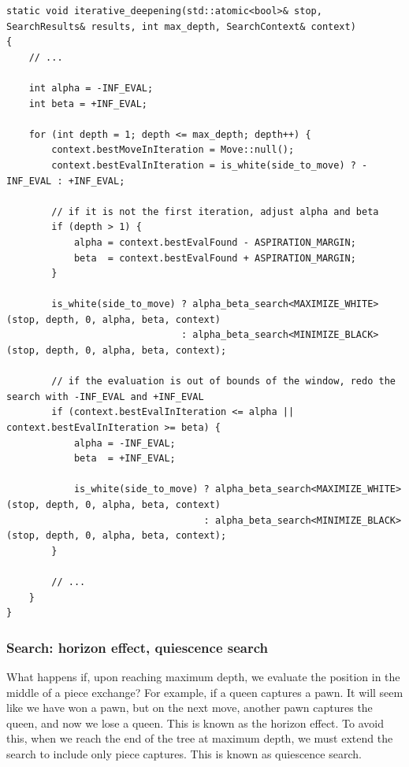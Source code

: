 \begin{lstlisting}[breaklines=true, frame=single, caption={Aspiration window.}]
static void iterative_deepening(std::atomic<bool>& stop, SearchResults& results, int max_depth, SearchContext& context)
{
    // ...

    int alpha = -INF_EVAL;
    int beta = +INF_EVAL;

    for (int depth = 1; depth <= max_depth; depth++) {
        context.bestMoveInIteration = Move::null();
        context.bestEvalInIteration = is_white(side_to_move) ? -INF_EVAL : +INF_EVAL;

        // if it is not the first iteration, adjust alpha and beta
        if (depth > 1) {
            alpha = context.bestEvalFound - ASPIRATION_MARGIN;
            beta  = context.bestEvalFound + ASPIRATION_MARGIN;
        }

        is_white(side_to_move) ? alpha_beta_search<MAXIMIZE_WHITE>(stop, depth, 0, alpha, beta, context)
                               : alpha_beta_search<MINIMIZE_BLACK>(stop, depth, 0, alpha, beta, context);

        // if the evaluation is out of bounds of the window, redo the search with -INF_EVAL and +INF_EVAL
        if (context.bestEvalInIteration <= alpha || context.bestEvalInIteration >= beta) {
            alpha = -INF_EVAL;
            beta  = +INF_EVAL;

            is_white(side_to_move) ? alpha_beta_search<MAXIMIZE_WHITE>(stop, depth, 0, alpha, beta, context)
                                   : alpha_beta_search<MINIMIZE_BLACK>(stop, depth, 0, alpha, beta, context);
        }

        // ...
    }
}
\end{lstlisting}

\subsubsection{Search: horizon effect, quiescence search}

What happens if, upon reaching maximum depth, we evaluate the position in the middle of a piece exchange? For example, if a queen captures a pawn. It will seem like we have won a pawn, but on the next move, another pawn captures the queen, and now we lose a queen. This is known as the horizon effect. To avoid this, when we reach the end of the tree at maximum depth, we must extend the search to include only piece captures. This is known as quiescence search.

\vspace{1em}


